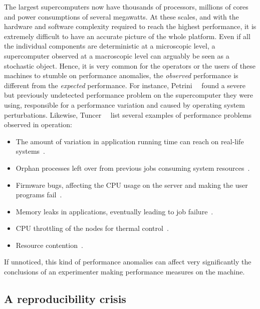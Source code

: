             The largest supercomputers now have thousands of processors, millions of cores and power consumptions of several
            megawatts. At these scales, and with the hardware and software complexity required to reach the highest
            performance, it is extremely difficult to have an accurate picture of the whole platform. Even if all the
            individual components are deterministic at a microscopic level, a supercomputer observed at a macroscopic level
            can arguably be seen as a stochastic object. Hence, it is very common for the operators or the users of these
            machines to stumble on performance anomalies, \ie the \emph{observed} performance is different from the
            \emph{expected} performance. For instance, Petrini~\etal~\cite{Petrini_2003} found a severe but previously
            undetected performance problem on the supercomputer they were using, responsible for a 
            performance variation and caused by operating system perturbations. Likewise,
            Tuncer~\etal~\cite[Section~1]{Tuncer_2017} list several examples of performance problems observed in operation:
            \begin{itemize}
                \item The amount of variation in application running time can reach  on real-life
                    systems~\cite{Bhatele_2013,Skinner}.
                \item Orphan processes left over from previous jobs consuming system resources~\cite{Brandt_2010}.
                \item Firmware bugs, affecting the CPU usage on the server and making the user programs
                    fail~\cite{cisco_bug}.
                \item Memory leaks in applications, eventually leading to job failure~\cite{Agelastos_2015}.
                \item CPU throttling of the nodes for thermal control~\cite{Brandt2015EnablingAO}.
                \item Resource contention~\cite{Bhatele_2013,dorier:hal-00916091}.
            \end{itemize}
            If unnoticed, this kind of performance anomalies can affect very significantly the conclusions of an
            experimenter making performance measures on the machine.

        \subsection{A reproducibility crisis}%
        \label{sub:reproducibility_crisis}

